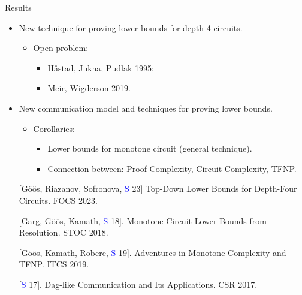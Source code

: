 \begin{frame}{Results}

    \begin{itemize}   
        \item New technique for proving lower bounds for depth-4 circuits.
            \begin{itemize}
                \item Open problem:
                    \begin{itemize}
                        \item H{\aa}stad, Jukna, Pudlak 1995;
                        \item Meir, Wigderson 2019.
                    \end{itemize}
            \end{itemize}
        \pause
        \item New communication model and techniques for proving lower bounds.
            \begin{itemize}
                \item Corollaries:
                    \begin{itemize}
                        \item Lower bounds for monotone circuit (\alert{general technique}).
                        \item Connection between: Proof Complexity, Circuit Complexity, TFNP.
                    \end{itemize}
            \end{itemize}
    \end{itemize}


    \begin{enumerate}
        \item[] [G{\"{o}}{\"{o}}s, Riazanov, Sofronova, \textcolor{blue}{S} 23] Top-Down Lower Bounds for
            Depth-Four Circuits. FOCS 2023.
        \item[] [Garg, G\"{o}\"{o}s, Kamath, \textcolor{blue}{S} 18]. Monotone Circuit Lower Bounds from
            Resolution. STOC 2018.
        \item[] [G\"{o}\"{o}s, Kamath, Robere, \textcolor{blue}{S} 19]. Adventures in Monotone Complexity and
            TFNP. ITCS 2019.
        \item[] [\textcolor{blue}{S} 17]. Dag-like Communication and Its Applications. CSR 2017.
    \end{enumerate}
    
\end{frame}



